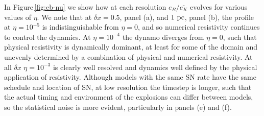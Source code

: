 \documentclass[preprint2]{aastex63}
\newcommand\Rm{{\rm Rm} }
\newcommand\pc{~ {\rm pc}}
\newcommand\dx{ {\delta x}}
\begin{document}
In Figure\,\ref{fig:eb-nu} we show how at each resolution $e_B/\overline{e_K}$
evolves for various values of $\eta$.
We note that at $\dx=0.5$, panel (a), and $1\pc$, panel (b), the profile at
$\eta=10^{-5}$ is indistinguishable from $\eta=0$, and so numerical resistivity
continues to control the dynamics.
At $\eta=10^{-4}$ the dynamo diverges from $\eta=0$, such that physical
resistivity is dynamically dominant, at least for some of the domain and
unevenly determined by a combination of physical and numerical resistivity.
At all $\dx$ $\eta=10^{-3}$ is clearly well resolved and dynamics
well defined by the physical application of resistivity.
Although models with the same SN rate have the same schedule and location of
SN, at low resolution the timestep is longer, such that the actual timing and 
environment of the explosions can differ between models, so the statistical
noise is more evident, particularly in panels (e) and (f).



\end{document}

